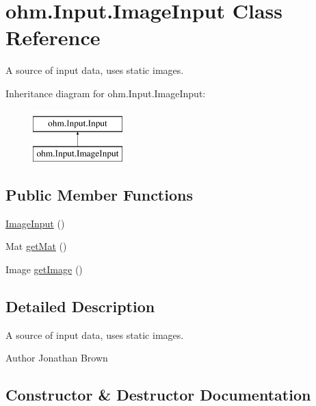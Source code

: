 \hypertarget{classohm_1_1_input_1_1_image_input}{}\section{ohm.\+Input.\+Image\+Input Class Reference}
\label{classohm_1_1_input_1_1_image_input}


A source of input data, uses static images.  


Inheritance diagram for ohm.\+Input.\+Image\+Input\+:\begin{figure}[H]
\begin{center}
\leavevmode
\includegraphics[height=2.000000cm]{classohm_1_1_input_1_1_image_input}
\end{center}
\end{figure}
\subsection*{Public Member Functions}
\begin{DoxyCompactItemize}
\item 
\hyperlink{classohm_1_1_input_1_1_image_input_a882f829f50e890d38247aedf79bab80a}{Image\+Input} ()
\item 
Mat \hyperlink{classohm_1_1_input_1_1_image_input_a25141276b489aa062e7c855cb35c3b14}{get\+Mat} ()
\item 
Image \hyperlink{classohm_1_1_input_1_1_image_input_a589cf238e644e9bd38a1473fedf2399c}{get\+Image} ()
\end{DoxyCompactItemize}


\subsection{Detailed Description}
A source of input data, uses static images. 

\begin{DoxyAuthor}{Author}
Jonathan Brown 
\end{DoxyAuthor}


\subsection{Constructor \& Destructor Documentation}
\hypertarget{classohm_1_1_input_1_1_image_input_a882f829f50e890d38247aedf79bab80a}{}\label{classohm_1_1_input_1_1_image_input_a882f829f50e890d38247aedf79bab80a} 
